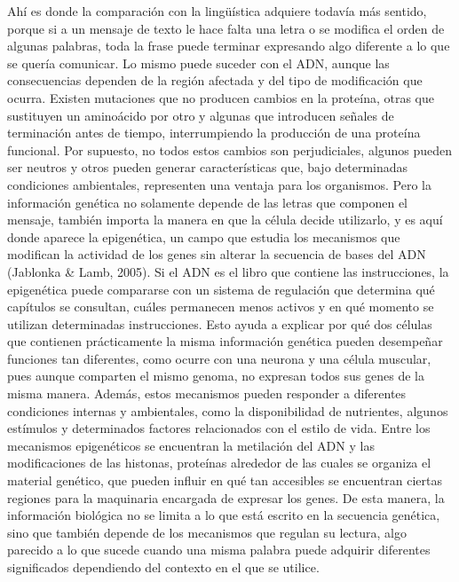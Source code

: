 \documentclass[12pt]{article}
\begin{document}
Ahí es donde la comparación con la lingüística adquiere todavía más sentido, porque si a un mensaje de texto le hace falta una letra o se modifica el orden de algunas palabras, toda la frase puede terminar expresando algo diferente a lo que se quería comunicar. Lo mismo puede suceder con el ADN, aunque las consecuencias dependen de la región afectada y del tipo de modificación que ocurra. Existen mutaciones que no producen cambios en la proteína, otras que sustituyen un aminoácido por otro y algunas que introducen señales de terminación antes de tiempo, interrumpiendo la producción de una proteína funcional. Por supuesto, no todos estos cambios son perjudiciales, algunos pueden ser neutros y otros pueden generar características que, bajo determinadas condiciones ambientales, representen una ventaja para los organismos.
Pero la información genética no solamente depende de las letras que componen el mensaje, también importa la manera en que la célula decide utilizarlo, y es aquí donde aparece la epigenética, un campo que estudia los mecanismos que modifican la actividad de los genes sin alterar la secuencia de bases del ADN (Jablonka & Lamb, 2005). Si el ADN es el libro que contiene las instrucciones, la epigenética puede compararse con un sistema de regulación que determina qué capítulos se consultan, cuáles permanecen menos activos y en qué momento se utilizan determinadas instrucciones. Esto ayuda a explicar por qué dos células que contienen prácticamente la misma información genética pueden desempeñar funciones tan diferentes, como ocurre con una neurona y una célula muscular, pues aunque comparten el mismo genoma, no expresan todos sus genes de la misma manera.
Además, estos mecanismos pueden responder a diferentes condiciones internas y ambientales, como la disponibilidad de nutrientes, algunos estímulos y determinados factores relacionados con el estilo de vida. Entre los mecanismos epigenéticos se encuentran la metilación del ADN y las modificaciones de las histonas, proteínas alrededor de las cuales se organiza el material genético, que pueden influir en qué tan accesibles se encuentran ciertas regiones para la maquinaria encargada de expresar los genes. De esta manera, la información biológica no se limita a lo que está escrito en la secuencia genética, sino que también depende de los mecanismos que regulan su lectura, algo parecido a lo que sucede cuando una misma palabra puede adquirir diferentes significados dependiendo del contexto en el que se utilice.
\end{document}
